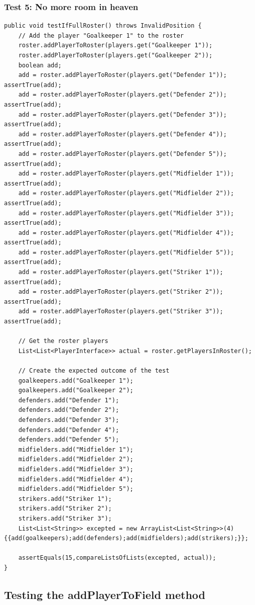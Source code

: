 \documentclass{article}
\begin{document}
\subsubsection{Test 5: No more room in heaven}
\begin{lstlisting}
public void testIfFullRoster() throws InvalidPosition {
	// Add the player "Goalkeeper 1" to the roster
	roster.addPlayerToRoster(players.get("Goalkeeper 1"));
	roster.addPlayerToRoster(players.get("Goalkeeper 2"));
	boolean add;
	add = roster.addPlayerToRoster(players.get("Defender 1"));	assertTrue(add);
	add = roster.addPlayerToRoster(players.get("Defender 2"));	assertTrue(add);
	add = roster.addPlayerToRoster(players.get("Defender 3"));	assertTrue(add);
	add = roster.addPlayerToRoster(players.get("Defender 4"));	assertTrue(add);
	add = roster.addPlayerToRoster(players.get("Defender 5"));	assertTrue(add);
	add = roster.addPlayerToRoster(players.get("Midfielder 1"));	assertTrue(add);
	add = roster.addPlayerToRoster(players.get("Midfielder 2"));	assertTrue(add);
	add = roster.addPlayerToRoster(players.get("Midfielder 3"));	assertTrue(add);
	add = roster.addPlayerToRoster(players.get("Midfielder 4"));	assertTrue(add);
	add = roster.addPlayerToRoster(players.get("Midfielder 5"));	assertTrue(add);
	add = roster.addPlayerToRoster(players.get("Striker 1"));		assertTrue(add);
	add = roster.addPlayerToRoster(players.get("Striker 2"));		assertTrue(add);
	add = roster.addPlayerToRoster(players.get("Striker 3"));		assertTrue(add);
	
	// Get the roster players
	List<List<PlayerInterface>> actual = roster.getPlayersInRoster();
	
	// Create the expected outcome of the test
	goalkeepers.add("Goalkeeper 1");
	goalkeepers.add("Goalkeeper 2");
	defenders.add("Defender 1");
	defenders.add("Defender 2");
	defenders.add("Defender 3");
	defenders.add("Defender 4");
	defenders.add("Defender 5");
	midfielders.add("Midfielder 1");
	midfielders.add("Midfielder 2");
	midfielders.add("Midfielder 3");
	midfielders.add("Midfielder 4");
	midfielders.add("Midfielder 5");
	strikers.add("Striker 1");
	strikers.add("Striker 2");
	strikers.add("Striker 3");
	List<List<String>> excepted = new ArrayList<List<String>>(4) {{add(goalkeepers);add(defenders);add(midfielders);add(strikers);}};
	
	assertEquals(15,compareListsOfLists(excepted, actual));
}
\end{lstlisting}
\subsection{Testing the addPlayerToField method}
\end{document}
